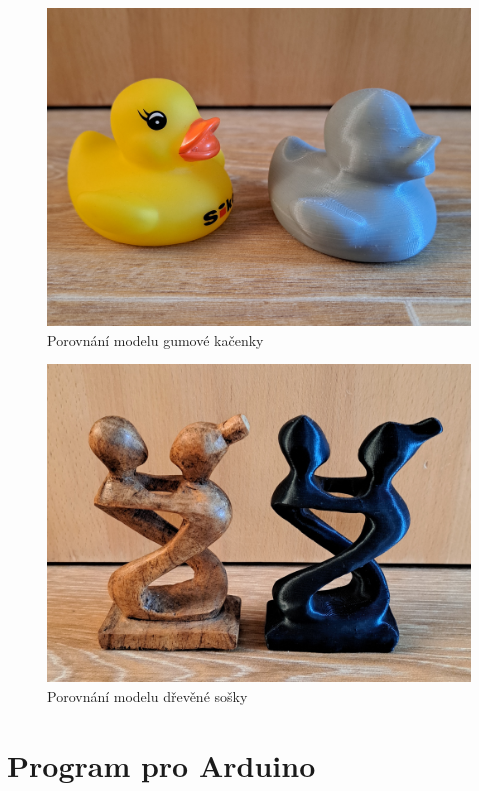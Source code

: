 \documentclass[12pt]{report}			%
\begin{document}
\begin{appendices}
        \begin{figure}[h]
            \centering
            \includegraphics[width =\textwidth]{images/kacenaSrovnani.jpg}
            \caption{Porovnání modelu gumové kačenky}
        \end{figure}
       
        \begin{figure}[h]
            \centering
            \includegraphics[width =\textwidth]{images/sochaPorovnani.jpg}
            \caption{Porovnání modelu dřevěné sošky}
        \end{figure}

    \chapter{Program pro Arduino}
    

\end{appendices}
\end{document}
